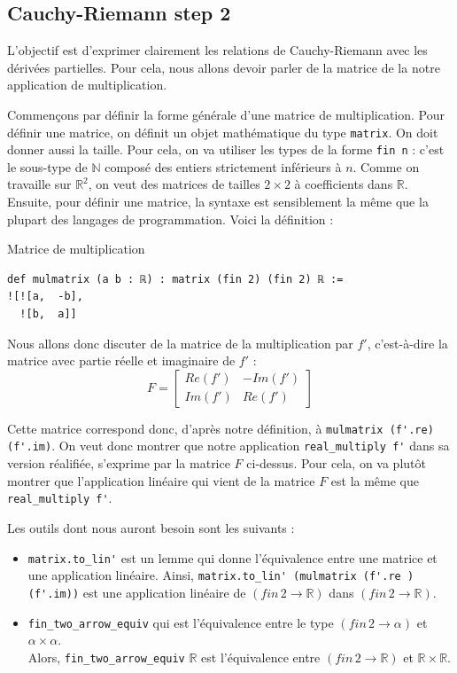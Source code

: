 \documentclass[a4paper, 11pt, twoside]{report}
\newcommand\N{\mathbb{N}}
\newcommand\R{\mathbb{R}}
\begin{document}
\subsection{Cauchy-Riemann step 2}

L'objectif est d'exprimer clairement les relations de Cauchy-Riemann avec les dérivées partielles. Pour cela, nous allons devoir parler de la matrice de la notre application de multiplication. 

\medskip

Commençons par définir la forme générale d'une matrice de multiplication.
Pour définir une matrice, on définit un objet mathématique du type \verb|matrix|. On doit donner aussi la taille. Pour cela, on va utiliser les types de la forme \verb|fin n| : c'est le sous-type de $\N$ composé des entiers strictement inférieurs à $n$. Comme on travaille sur $\R^2$, on veut des matrices de tailles $2\times 2$ à coefficients dans $\R$. Ensuite, pour définir une matrice, la syntaxe est sensiblement la même que la plupart des langages de programmation. Voici la définition :

\begin{code}{Matrice de multiplication}
\begin{lstlisting}
def mulmatrix (a b : ℝ) : matrix (fin 2) (fin 2) ℝ :=
![![a,  -b],
  ![b,  a]]
\end{lstlisting}
\end{code}

Nous allons donc discuter de la matrice de la multiplication par $f'$, c'est-à-dire la matrice avec partie réelle et imaginaire de $f'$ :
\[F = \begin{bmatrix}
Re(f') & -Im(f') \\ Im(f') & Re(f')
\end{bmatrix}\]

Cette matrice correspond donc, d'après notre définition, à \verb|mulmatrix (f'.re) (f'.im)|. On veut donc montrer que notre application \verb|real_multiply f'| dans sa version réalifiée, s'exprime par la matrice $F$ ci-dessus. Pour cela, on va plutôt montrer que l'application linéaire qui vient de la matrice $F$ est la même que \verb|real_multiply f'|.

\medskip

Les outils dont nous auront besoin sont les suivants :
\begin{itemize}
	\item \verb|matrix.to_lin'| est un lemme qui donne l'équivalence entre une matrice et une application linéaire. Ainsi, \verb|matrix.to_lin' (mulmatrix (f'.re ) (f'.im))| est une application linéaire de $(fin\, 2\rightarrow \R)$ dans $(fin\, 2\rightarrow \R)$.
	\item \verb|fin_two_arrow_equiv| qui est l'équivalence entre le type $(fin\, 2\to \alpha)$ et $\alpha\times\alpha$. \\
	Alors, \verb|fin_two_arrow_equiv| $\R$ est l'équivalence entre $(fin\,2\to\R)$ et $\R\times \R$.
\end{itemize}
\end{document}
